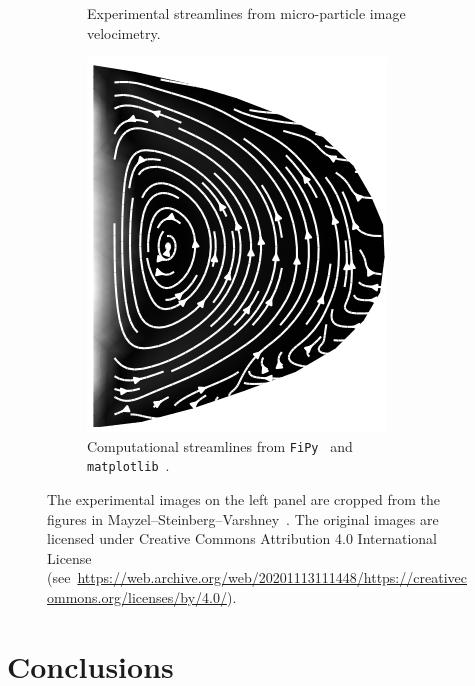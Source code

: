 \documentclass[12pt]{rmstyle}
\begin{document}
\begin{figure}[htbp]
\begin{subfigure}[b]{0.3\textwidth}
    \caption{Experimental streamlines from micro-particle image velocimetry. \cite{mayzel2019stokes}}
    \label{fig:velocimetry}
  \end{subfigure}
  \hspace{2cm}
  \begin{subfigure}[b]{0.3\textwidth}
    \centering
    \includegraphics[width=\textwidth]{./esimerkki_4.png}
    \caption{Computational streamlines from \texttt{FiPy}~\cite{FiPy2009} and \texttt{matplotlib}~\cite{hunter2007matplotlib}.}
    \label{fig:result}
  \end{subfigure}
  \hfill
\caption{
  The experimental images on
  the left panel are cropped from the figures in
  Mayzel--Steinberg--Varshney~\cite{mayzel2019stokes}. The original images are
  licensed under Creative Commons Attribution 4.0 International License
  (see~\url{https://web.archive.org/web/20201113111448/https://creativecommons.org/licenses/by/4.0/}).
}
\label{fig:esimerkki}
\end{figure}

\section{Conclusions}
\label{sec:org615e973}
\end{document}
